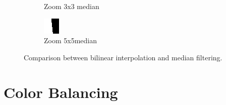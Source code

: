 \documentclass[a4paper]{article}
\begin{document}
\begin{figure}[H]
\begin{subfigure}[h]{0.32\textwidth}
		\caption*{Zoom 3x3 median}
	\end{subfigure}
	\begin{subfigure}[h]{0.32\textwidth}
		\centering
		\includegraphics[width=\textwidth]{black_and_white_median_filtered_5x5_zoom}
		\caption*{Zoom 5x5median}
	\end{subfigure}
\caption{Comparison between bilinear interpolation and median filtering.}
\label{fig:compareDemosaicing}
\end{figure}
\section{Color Balancing}
\end{document}
